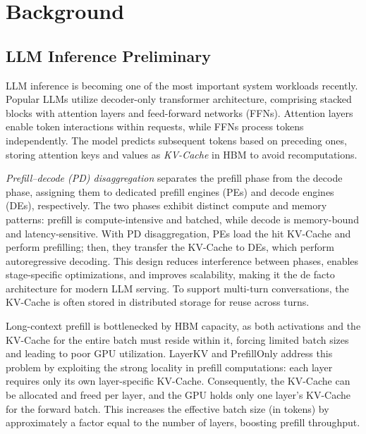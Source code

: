 \section{Background}

\label{sec:background}

\subsection{LLM Inference Preliminary}
LLM inference is becoming one of the most important system workloads recently.
Popular LLMs utilize decoder-only transformer architecture, comprising stacked blocks with attention layers and feed-forward networks (FFNs).
Attention layers enable token interactions within requests, while FFNs process tokens independently.
The model predicts subsequent tokens based on preceding ones, storing attention keys and values as \emph{KV-Cache} in HBM to avoid recomputations.

 \emph{Prefill–decode (PD) disaggregation}  \cite{OSDI24:DistServe, ISCA24:Splitwise} separates the prefill phase from the decode phase, assigning them to dedicated prefill engines (PEs) and decode engines (DEs), respectively. The two phases exhibit distinct compute and memory patterns: prefill is compute-intensive and batched, while decode is memory-bound and latency-sensitive. With PD disaggregation, PEs load the hit KV-Cache and perform prefilling; then, they transfer the KV-Cache to DEs, which perform autoregressive decoding. This design reduces interference between phases, enables stage-specific optimizations, and improves scalability, making it the de facto architecture for modern LLM serving. To support multi-turn conversations, the KV-Cache is often stored in distributed storage for reuse across turns.

 Long-context prefill is bottlenecked by HBM capacity, as both activations and the KV-Cache for the entire batch must reside within it, forcing limited batch sizes and leading to poor GPU utilization. LayerKV \cite{LayerKV} and PrefillOnly \cite{SOSP25:PrefillOnly} address this problem by exploiting the strong locality in prefill computations: each layer requires only its own layer-specific KV-Cache. Consequently, the KV-Cache can be allocated and freed per layer, and the GPU holds only one layer's KV-Cache for the forward batch. This increases the effective batch size (in tokens) by approximately a factor equal to the number of layers, boosting prefill throughput.


